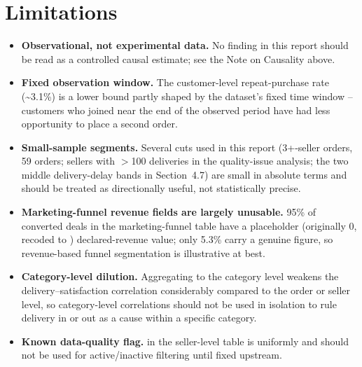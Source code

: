 \documentclass[11pt,a4paper]{report}
\begin{document}
\clearpage

\chapter{Limitations}

\begin{itemize}[leftmargin=2em]
    \item \textbf{Observational, not experimental data.} No finding in this report should be read
        as a controlled causal estimate; see the Note on Causality above.
    \item \textbf{Fixed observation window.} The customer-level repeat-purchase rate
        (\textasciitilde3.1\%) is a lower bound partly shaped by the dataset's fixed time window --
        customers who joined near the end of the observed period have had less opportunity to
        place a second order.
    \item \textbf{Small-sample segments.} Several cuts used in this report (3+-seller orders, 59
        orders; sellers with $>$100 deliveries in the quality-issue analysis; the two middle
        delivery-delay bands in Section~4.7) are small in absolute terms and should be treated as
        directionally useful, not statistically precise.
    \item \textbf{Marketing-funnel revenue fields are largely unusable.} 95\% of converted deals in
        the marketing-funnel table have a placeholder (originally 0, recoded to )
        declared-revenue value; only 5.3\% carry a genuine figure, so revenue-based funnel
        segmentation is illustrative at best.
    \item \textbf{Category-level dilution.} Aggregating to the category level weakens the
        delivery--satisfaction correlation considerably compared to the order or seller level, so
        category-level correlations should not be used in isolation to rule delivery in or out as a
        cause within a specific category.
    \item \textbf{Known data-quality flag.}  in the seller-level table
        is uniformly  and should not be used for active/inactive filtering until fixed
        upstream.
\end{itemize}

\clearpage

\end{document}
